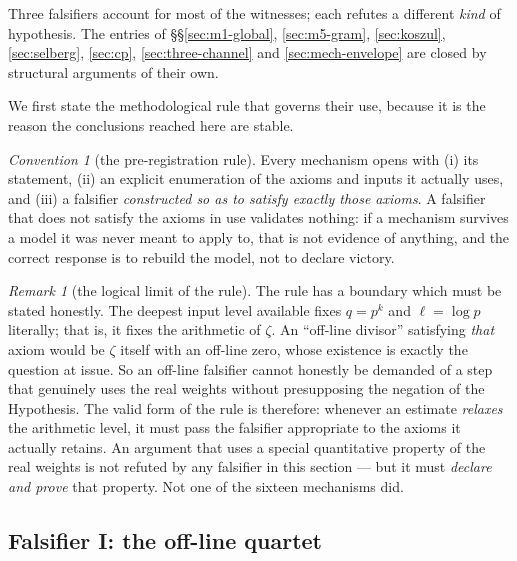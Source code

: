 \documentclass[11pt]{amsart}
\theoremstyle{definition}
\theoremstyle{remark}
\newtheorem{remark}[theorem]{Remark}
\newtheorem{convention}[theorem]{Convention}
\theoremstyle{definition}
\begin{document}
Three falsifiers account for most of the witnesses; each refutes a different \emph{kind} of
hypothesis. The entries of \S\S\ref{sec:m1-global}, \ref{sec:m5-gram}, \ref{sec:koszul},
\ref{sec:selberg}, \ref{sec:cp}, \ref{sec:three-channel} and \ref{sec:mech-envelope} are closed by
structural arguments of their own.

We first state the methodological rule that governs their use, because it is the reason the conclusions reached here are stable.

\begin{convention}[the pre-registration rule]\label{conv:prereg}
Every mechanism opens with (i) its statement, (ii) an explicit enumeration of the axioms and inputs
it actually uses, and (iii) a falsifier \emph{constructed so as to satisfy exactly those axioms}.
A falsifier that does not satisfy the axioms in use validates nothing: if a mechanism survives a
model it was never meant to apply to, that is not evidence of anything, and the correct response is
to rebuild the model, not to declare victory.
\end{convention}

\begin{remark}[the logical limit of the rule]\label{rmk:prereg-limit}
The rule has a boundary which must be stated honestly. The deepest input level available fixes
$q=p^k$ and $\ell=\log p$ literally; that is, it fixes the arithmetic of $\zeta$. An ``off-line
divisor'' satisfying \emph{that} axiom would be $\zeta$ itself with an off-line zero, whose
existence is exactly the question at issue. So an off-line falsifier cannot honestly be demanded of
a step that genuinely uses the real weights without presupposing the negation of the Hypothesis.
The valid form of the rule is therefore: whenever an estimate \emph{relaxes} the arithmetic level,
it must pass the falsifier appropriate to the axioms it actually retains. An argument that uses a
special quantitative property of the real weights is not refuted by any falsifier in this
section --- but it must \emph{declare and prove} that property. Not one of the sixteen mechanisms
did.
\end{remark}

\subsection{Falsifier I: the off-line quartet}\label{sec:fals-quartet}
\end{document}
